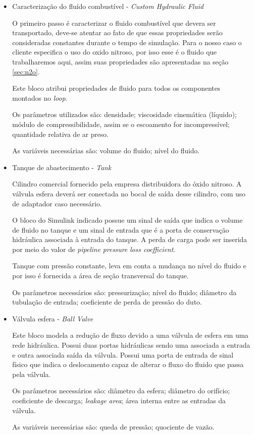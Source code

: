 \begin{itemize}
    \item Caracterização do fluído combustível - \textit{Custom Hydraulic Fluid} 
    \par O primeiro passo é caracterizar o fluido combustível que devera ser transportado, deve-se atentar ao fato de que essas propriedades serão consideradas constantes durante o tempo de simulação. Para o nosso caso o cliente especifica o uso do oxido nitroso, por isso esse é o fluido que trabalharemos aqui, assim suas propriedades são apresentadas na seção \ref{sec:n2o}.
    \par Este bloco atribui propriedades de fluido para todos os componentes montados no \textit{loop}. 
    \par Os parâmetros utilizados são: densidade; viscosidade cinemática (líquido); módulo de compressibilidade, assim se o escoamento for incompressível; quantidade relativa de ar preso.
    \par As variáveis necessárias são: volume do fluido; nível do fluido.
    
    \item Tanque de abastecimento - \textit{Tank}
    \par Cilindro comercial fornecido pela empresa distribuidora do óxido nitroso. A válvula esfera deverá ser conectada no bocal de saída desse cilindro, com uso de adaptador caso necessário. 
    \par O bloco do Simulink indicado possue um sinal de saída que indica o volume de fluido no tanque e um sinal de entrada que é a porta de conservação hidráulica associada à entrada do tanque. A perda de carga pode ser inserida por meio do valor de \textit{pipeline pressure loss coefficient}. 
    \par Tanque com pressão constante, leva em conta a mudança no nível do fluido e por isso é fornecida a área de seção transversal do tanque. 
    \par Os parâmetros necessários são: pressurização; nível do fluido; diâmetro da tubulação de entrada; coeficiente de perda de pressão do duto.
    
    \item Válvula esfera - \textit{Ball Valve} 
    \par Este bloco modela a redução de fluxo devido a uma válvula de esfera em uma rede hidráulica. Possui duas portas hidráulicas sendo uma associada a entrada e outra associada saída da válvula. Possui uma porta de entrada de sinal físico que indica o deslocamento capaz de alterar o fluxo do fluido que passa pela válvula. 
    \par Os parâmetros necessários são: diâmetro da esfera; diâmetro do orifício; coeficiente de descarga; \textit{leakage area}; área interna entre as entradas da válvula.
    \par As variáveis necessárias são: queda de pressão; quociente de vazão.
    

\end{itemize}
